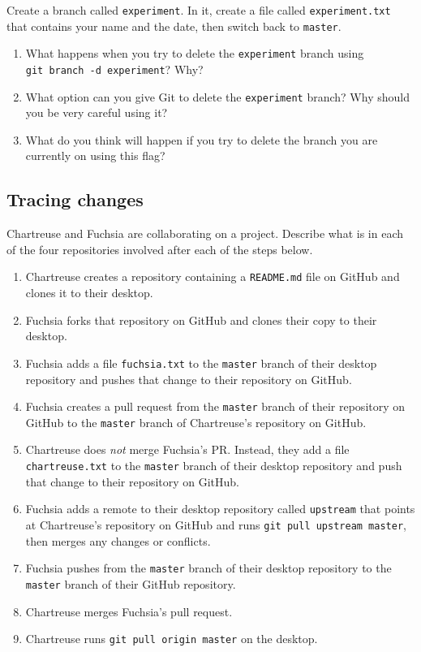 \documentclass[
]{krantz}
\providecommand{\tightlist}{%
  \setlength{\itemsep}{0pt}\setlength{\parskip}{0pt}}
\begin{document}
Create a branch called \texttt{experiment}.
In it, create a file called \texttt{experiment.txt} that contains your name and the date,
then switch back to \texttt{master}.

\begin{enumerate}
\def\labelenumi{\arabic{enumi}.}
\item
  What happens when you try to delete the \texttt{experiment} branch using \texttt{git\ branch\ -d\ experiment}?
  Why?
\item
  What option can you give Git to delete the \texttt{experiment} branch?
  Why should you be very careful using it?
\item
  What do you think will happen if you try to delete the branch you are currently on using this flag?
\end{enumerate}

\hypertarget{git-advanced-ex-trace-changes}{%
\subsection{Tracing changes}\label{git-advanced-ex-trace-changes}}

Chartreuse and Fuchsia are collaborating on a project.
Describe what is in each of the four repositories involved after each of the steps below.

\begin{enumerate}
\def\labelenumi{\arabic{enumi}.}
\tightlist
\item
  Chartreuse creates a repository containing a \texttt{README.md} file on GitHub
  and clones it to their desktop.
\item
  Fuchsia forks that repository on GitHub
  and clones their copy to their desktop.
\item
  Fuchsia adds a file \texttt{fuchsia.txt} to the \texttt{master} branch of their desktop repository
  and pushes that change to their repository on GitHub.
\item
  Fuchsia creates a pull request from the \texttt{master} branch of their repository on GitHub
  to the \texttt{master} branch of Chartreuse's repository on GitHub.
\item
  Chartreuse does \emph{not} merge Fuchsia's PR.
  Instead,
  they add a file \texttt{chartreuse.txt} to the \texttt{master} branch of their desktop repository
  and push that change to their repository on GitHub.
\item
  Fuchsia adds a remote to their desktop repository called \texttt{upstream}
  that points at Chartreuse's repository on GitHub
  and runs \texttt{git\ pull\ upstream\ master},
  then merges any changes or conflicts.
\item
  Fuchsia pushes from the \texttt{master} branch of their desktop repository
  to the \texttt{master} branch of their GitHub repository.
\item
  Chartreuse merges Fuchsia's pull request.
\item
  Chartreuse runs \texttt{git\ pull\ origin\ master} on the desktop.
\end{enumerate}
\end{document}
